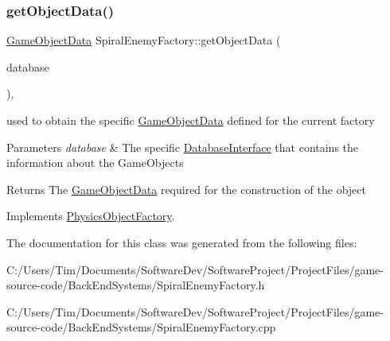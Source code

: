 \subsubsection{\texorpdfstring{get\+Object\+Data()}{getObjectData()}}
{\footnotesize\ttfamily \hyperlink{struct_game_object_data}{Game\+Object\+Data} Spiral\+Enemy\+Factory\+::get\+Object\+Data (\begin{DoxyParamCaption}\item[{const std\+::shared\+\_\+ptr$<$ \hyperlink{class_database_interface}{Database\+Interface} $>$ \&}]{database }\end{DoxyParamCaption})\hspace{0.3cm}{\ttfamily [override]}, {\ttfamily [virtual]}}



used to obtain the specific \hyperlink{struct_game_object_data}{Game\+Object\+Data} defined for the current factory 


\begin{DoxyParams}{Parameters}
{\em database} & The specific \hyperlink{class_database_interface}{Database\+Interface} that contains the information about the Game\+Objects \\
\hline
\end{DoxyParams}
\begin{DoxyReturn}{Returns}
The \hyperlink{struct_game_object_data}{Game\+Object\+Data} required for the construction of the object 
\end{DoxyReturn}


Implements \hyperlink{class_physics_object_factory_aa59f52d3adc1fac676f4a8a3c2de9ba9}{Physics\+Object\+Factory}.



The documentation for this class was generated from the following files\+:\begin{DoxyCompactItemize}
\item 
C\+:/\+Users/\+Tim/\+Documents/\+Software\+Dev/\+Software\+Project/\+Project\+Files/game-\/source-\/code/\+Back\+End\+Systems/Spiral\+Enemy\+Factory.\+h\item 
C\+:/\+Users/\+Tim/\+Documents/\+Software\+Dev/\+Software\+Project/\+Project\+Files/game-\/source-\/code/\+Back\+End\+Systems/Spiral\+Enemy\+Factory.\+cpp\end{DoxyCompactItemize}
